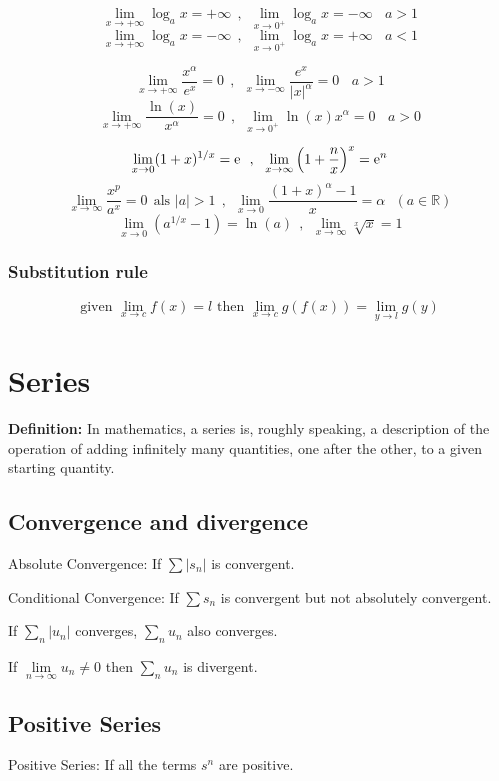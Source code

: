 \[
\lim_{x\rightarrow+\infty}\log_ax=+\infty ~~,~~ \lim_{x\rightarrow0^+}\log_ax=-\infty ~~~~ a>1
\]
\[
\lim_{x\rightarrow+\infty}\log_ax=-\infty ~~,~~ \lim_{x\rightarrow0^+}\log_ax=+\infty ~~~~ a<1
\]

\[
\lim_{x\rightarrow+\infty}\frac{x^\alpha}{e^x}=0 ~~,~~ \lim_{x\rightarrow-\infty}\frac{e^x}{\left|x\right|^\alpha}=0 ~~~~ a>1
\]
\[
\lim_{x\rightarrow+\infty}\frac{\ln(x)}{x^\alpha}=0 ~~,~~ \lim_{x\rightarrow 0^+}\ln(x)x^\alpha=0 ~~~~ a>0
\]


\[
\lim_{x\rightarrow0}(1+x)^{1/x}={\rm e}~~,~~
\lim_{x\rightarrow\infty}\left(1+\frac{n}{x}\right)^x={\rm e}^n
\]
\[
\lim_{x\rightarrow\infty}\frac{x^p}{a^x}=0~~\mbox{als }|a|>1 ~~,~~
\lim_{x\rightarrow0}\frac{(1+x)^\alpha-1}{x}=\alpha ~~~ (a\in\mathbb{R})
\]
\[
\lim_{x\rightarrow0}\left(a^{1/x}-1\right)=\ln(a)~~,~~
\lim_{x\rightarrow\infty}\sqrt[x]{x}=1
\]

\subsubsection{Substitution rule}
\[
\text{given  } \lim_{x\rightarrow c}f(x)=l \text{   then   } \lim_{x\rightarrow c}g(f(x))=\lim_{y\rightarrow l}g(y) 
\]

\section{Series}
\textbf{Definition:} In mathematics, a series is, roughly speaking, a description of the operation of adding infinitely many quantities, one after the other, to a given starting quantity.

\subsection{Convergence and divergence}
Absolute Convergence: If $\sum\left|s_n\right|$ is convergent.

Conditional Convergence: If $\sum s_n$ is convergent but not absolutely convergent.

If $\sum\limits_n|u_n|$ converges, $\sum\limits_n u_n$ also converges.

If $\lim\limits_{n\rightarrow\infty}u_n\neq0$ then $\sum\limits_n u_n$ is divergent.

\subsection{Positive Series}
Positive Series: If all the terms $ s^n $ are positive.


